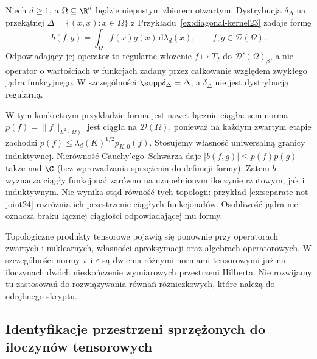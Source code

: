 \begin{przyklad}
\label{ex:diag-tensor24}
Niech $d\ge1$, a $\Omega\subseteq\R^d$ będzie
niepustym zbiorem otwartym. Dystrybucja
$\delta_\Delta$ na przekątnej $\Delta=\{(x,x):x\in\Omega\}$
z Przykładu~\ref{ex:diagonal-kernel23} zadaje formę
\[
 b(f,g)=\int_\Omega f(x)g(x)\,\mathrm d\lambda_d(x),
 \qquad f,g\in\mathcal D(\Omega).
\]
Odpowiadający jej operator to regularne włożenie
$f\mapsto T_f$ do $\mathcal D'(\Omega)_\beta$,
a nie operator o wartościach w funkcjach zadany
przez całkowanie względem zwykłego jądra funkcyjnego.
W szczególności $\supp\delta_\Delta=\Delta$,
a $\delta_\Delta$ nie jest dystrybucją regularną.

W tym konkretnym przykładzie forma jest nawet
łącznie ciągła: seminorma
$p(f)=\|f\|_{L^2(\Omega)}$ jest ciągła na
$\mathcal D(\Omega)$, ponieważ na każdym zwartym
etapie zachodzi
$p(f)\le\lambda_d(K)^{1/2}p_{K,0}(f)$.
Stosujemy własność uniwersalną granicy induktywnej.
Nierówność Cauchy'ego--Schwarza daje
$|b(f,g)|\le p(f)p(g)$ także nad $\C$
(bez wprowadzania sprzężenia do definicji formy).
Zatem $b$ wyznacza ciągły funkcjonał zarówno na
uzupełnionym iloczynie rzutowym, jak i induktywnym.
Nie wynika stąd równość tych topologii: przykład
\ref{ex:separate-not-joint24} rozróżnia ich
przestrzenie ciągłych funkcjonałów.
Osobliwość jądra nie oznacza braku łącznej
ciągłości odpowiadającej mu formy.
\end{przyklad}

\begin{uwaga}
\label{rem:tensor-next24}
Topologiczne produkty tensorowe pojawią się ponownie
przy operatorach zwartych i nuklearnych, własności
aproksymacji oraz algebrach operatorowych.
W szczególności normy $\pi$ i $\varepsilon$ są dwiema
różnymi normami tensorowymi już na iloczynach dwóch
nieskończenie wymiarowych przestrzeni Hilberta.
Nie rozwijamy tu zastosowań do rozwiązywania równań
różniczkowych, które należą do odrębnego skryptu.
\end{uwaga}

\subsection{Identyfikacje przestrzeni sprzężonych do iloczynów tensorowych}

